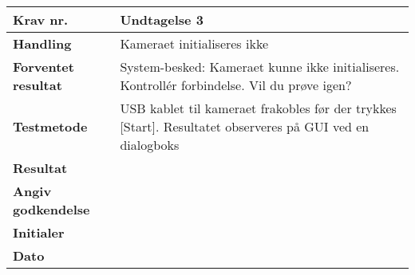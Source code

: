 	\begin{center}
		\begin{longtable}{ | m{4cm}| m{8.5cm}|} 
			\hline
			\textbf{Krav nr.} & Undtagelse 3   \\ 
			\hline
			\textbf{Handling} & Kameraet initialiseres ikke  \\
			\hline
			\textbf{Forventet resultat} & System-besked: Kameraet kunne ikke initialiseres. Kontrollér forbindelse. Vil du prøve igen? \\
			\hline
			\textbf{Testmetode}  & USB kablet til kameraet frakobles før der trykkes [Start]. Resultatet observeres på GUI ved en dialogboks   \\
			\hline
			\textbf{Resultat}  &    \\
			\hline
			\textbf{Angiv godkendelse} &     \\
			\hline
			\textbf{Initialer} &     \\
			\hline
			\textbf{Dato} &    \\
			\hline
		\end{longtable}
	\end{center}